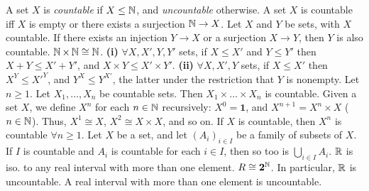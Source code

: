  A set $X$ is \textit{countable} if $X \leq \operatorname{\mathbb{N}}$, and \textit{uncountable} otherwise.
 A set $X$ is countable iff $X$ is empty or there exists a surjection $\operatorname{\mathbb{N}} \to X$.
 Let $X$ and $Y$ be sets, with $X$ countable. If there exists an injection $Y \to X$ or a surjection $X \to Y$, then $Y$ is also countable.
 $\operatorname{\mathbb{N}} \times \operatorname{\mathbb{N}} \cong \operatorname{\mathbb{N}}$.
 \textbf{(i)} $\forall X, X', Y, Y'$ sets, if $X \leq X'$ and $Y \leq Y'$ then $X + Y \leq X' + Y'$, and $X \times Y \leq X' \times Y'$. \textbf{(ii)} $\forall X, X', Y$ sets, if $X \leq X'$ then $X^Y \leq X'^Y$, and $Y^X \leq Y^{X'}$, the latter under the restriction that $Y$ is nonempty.
 Let $n \geq 1$. Let $X_1, \dots, X_n$ be countable sets. Then $X_1 \times \dots \times X_n$ is countable.
 Given a set $X$, we define $X^n$ for each $n \in \operatorname{\mathbb{N}}$ recursively: $X^0 = \mathbf{1}$, and $X^{n + 1} = X^n \times X$ ($n \in \operatorname{\mathbb{N}}$). Thus, $X^1 \cong X$, $X^2 \cong X \times X$, and so on.
 If $X$ is countable, then $X^n$ is countable $\forall n \geq 1$.
 Let $X$ be a set, and let $(A_i)_{i \in I}$ be a family of subsets of $X$. If $I$ is countable and $A_i$ is countable for each $i \in I$, then so too is $\bigcup_{i \in I} A_i$.
 $\operatorname{\mathbb{R}}$ is iso. to any real interval with more than one element.
 $R \cong \mathbf{2}^{\operatorname{\mathbb{N}}}$. In particular, $\operatorname{\mathbb{R}}$ is uncountable.
 A real interval with more than one element is uncountable.
